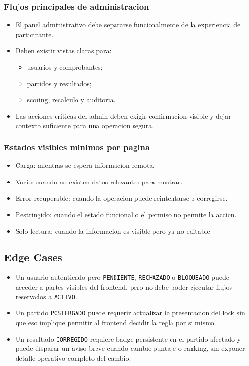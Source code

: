\subsubsection{Flujos principales de administracion}

\begin{itemize}
  \item El panel administrativo debe separarse funcionalmente de la experiencia de participante.
  \item Deben existir vistas claras para:
  \begin{itemize}
    \item usuarios y comprobantes;
    \item partidos y resultados;
    \item scoring, recalculo y auditoria.
  \end{itemize}
  \item Las acciones criticas del admin deben exigir confirmacion visible y dejar contexto suficiente para una operacion segura.
\end{itemize}

\subsubsection{Estados visibles minimos por pagina}

\begin{itemize}
  \item Carga: mientras se espera informacion remota.
  \item Vacio: cuando no existen datos relevantes para mostrar.
  \item Error recuperable: cuando la operacion puede reintentarse o corregirse.
  \item Restringido: cuando el estado funcional o el permiso no permite la accion.
  \item Solo lectura: cuando la informacion es visible pero ya no editable.
\end{itemize}

\subsection{Edge Cases}

\begin{itemize}
  \item Un usuario autenticado pero \texttt{PENDIENTE}, \texttt{RECHAZADO} o \texttt{BLOQUEADO} puede acceder a partes visibles del frontend, pero no debe poder ejecutar flujos reservados a \texttt{ACTIVO}.
  \item Un partido \texttt{POSTERGADO} puede requerir actualizar la presentacion del lock sin que eso implique permitir al frontend decidir la regla por si mismo.
  \item Un resultado \texttt{CORREGIDO} requiere badge persistente en el partido afectado y puede disparar un aviso breve cuando cambie puntaje o ranking, sin exponer detalle operativo completo del cambio.
\end{itemize}

